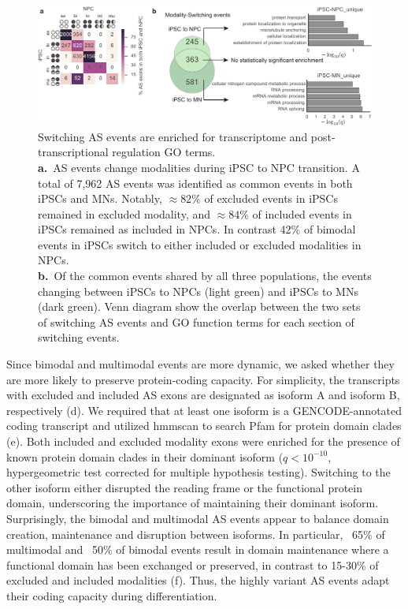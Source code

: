 \begin{figure}[h]
  \centering
  \includegraphics[width=5.8in]{figures/dynamic_modalities_supplementary.pdf}
  \caption[Switching AS events are enriched for transcriptome and post-transcriptional regulation GO terms.]{
  Switching AS events are enriched for transcriptome and post-transcriptional regulation GO terms.\\
\textbf{a.}~AS events change modalities during iPSC to NPC transition. A total of 7,962 AS events was identified as common events in both iPSCs and MNs. Notably, $\approx 82\%$ of excluded events in iPSCs remained in excluded modality, and $\approx 84\%$ of included events in iPSCs remained as included in NPCs. In contrast 42\% of bimodal events in iPSCs switch to either included or excluded modalities in NPCs.\\
\textbf{b.}~Of the common events shared by all three populations, the events changing between iPSCs to NPCs (light green) and iPSCs to MNs (dark green). Venn diagram show the overlap between the two sets of switching AS events and GO function terms for each section of switching events.\\
}
\label{fig:switching_modalities}
\end{figure}


Since bimodal and multimodal events are more dynamic, we asked whether they are more likely to preserve protein-coding capacity. For simplicity, the transcripts with excluded and included AS exons are designated as isoform A and isoform B, respectively (d). We required that at least one isoform is a GENCODE-annotated coding transcript and utilized  hmmscan \cite{Eddy:1998ut,Finn:2011eg} to search Pfam \cite{Finn:2016bf,Bateman2004-md} for protein domain clades (e). Both included and excluded modality exons were enriched for the presence of known protein domain clades in their dominant isoform ($q < 10^{-10}$, hypergeometric test corrected for multiple hypothesis testing). Switching to the other isoform either disrupted the reading frame or the functional protein domain, underscoring the importance of maintaining their dominant isoform. Surprisingly, the bimodal and multimodal AS events appear to balance domain creation, maintenance and disruption between isoforms. In particular, ~65\% of multimodal and ~50\% of bimodal events result in domain maintenance where a functional domain has been exchanged or preserved, in contrast to 15-30\% of excluded and included modalities (f). Thus, the highly variant AS events adapt their coding capacity during differentiation.

